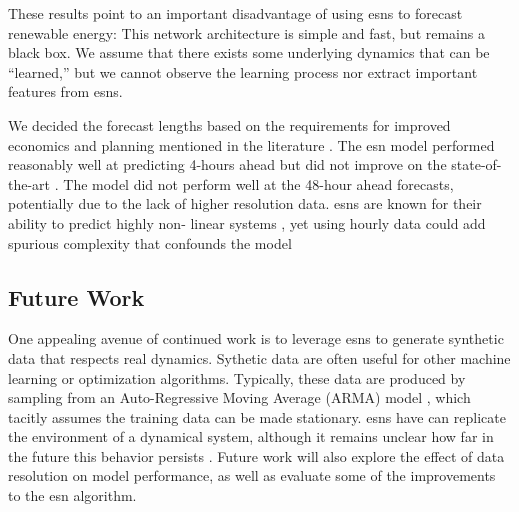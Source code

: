 These results point to an important disadvantage of using \glspl{esn} to
forecast renewable energy: This network architecture is simple and fast, but
remains a black box. We assume that there exists some underlying dynamics that
can be ``learned,'' but we cannot observe the learning process nor extract
important features from \glspl{esn}.

We decided the forecast lengths based on the requirements for improved
economics and planning mentioned in the literature
 \cite{wang_quantifying_2016,mc_garrigle_quantifying_2015,brancucci_martinez-anido_value_2016}. The \gls{esn} model performed reasonably well at predicting
 4-hours ahead but did not improve on the state-of-the-art
 \cite{wang_quantifying_2016,powers_weather_2017}. The model did not perform
 well at the 48-hour ahead forecasts, potentially due to the lack of higher
 resolution data. \glspl{esn} are known for their ability to predict highly non-
 linear systems \cite{jaeger_harnessing_2004,lukosevicius_reservoir_2009}, yet
 using hourly data could add spurious complexity that confounds the model
 \cite{garland_model-free_2014}

\subsection{Future Work}
One appealing avenue of continued work is to leverage \glspl{esn} to generate
synthetic data that respects real dynamics. Sythetic data are often useful for
other machine learning or optimization algorithms. Typically, these data are
produced by sampling from an Auto-Regressive Moving Average (ARMA) model \cite{baker_optimal_2018, garcia_dynamic_2016}, which tacitly assumes the
training data can be made stationary. \glspl{esn} have can replicate
the environment of a dynamical system, although it remains unclear how far
in the future this behavior persists \cite{pathak_using_2017,pathak_model-free_2018}.
Future work will also explore the effect of data resolution on model
performance, as well as evaluate some of the improvements to the \gls{esn}
algorithm.
